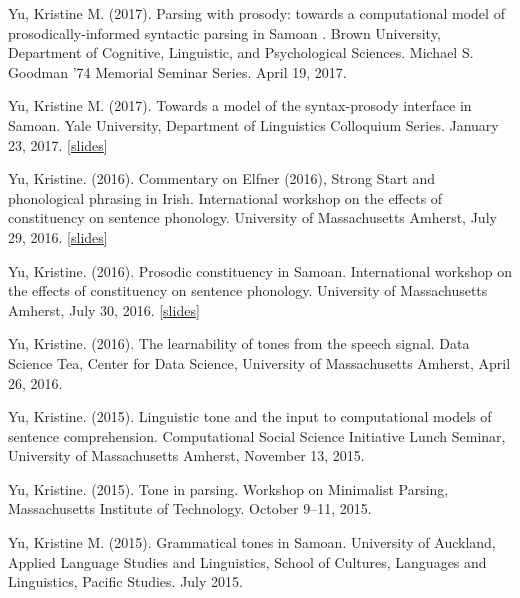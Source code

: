 \documentclass[10pt]{article}
\begin{document}
\begin{bibenum}

\item Yu, Kristine M. (2017). Parsing with prosody: towards a computational model of prosodically-informed syntactic parsing in Samoan
. Brown University, Department of
  Cognitive, Linguistic, and Psychological Sciences. Michael S. Goodman '74 Memorial Seminar Series. April 19, 2017.  
\item Yu, Kristine M. (2017). Towards a model of the syntax-prosody interface in Samoan. Yale University, Department of
  Linguistics Colloquium Series. January 23, 2017. [\href{https://speakerdeck.com/krisyu/towards-a-model-of-the-samoan-syntax-prosody-interface}{slides}]
  \item Yu, Kristine. (2016). Commentary on Elfner (2016), Strong
    Start and phonological phrasing in Irish. International workshop on the effects of
    constituency on sentence phonology. University of Massachusetts
    Amherst, July 29, 2016. [\href{https://speakerdeck.com/krisyu/commentary-on-elfners-strong-start-and-phonological-phrasing-in-irish}{slides}]

  \item Yu, Kristine. (2016). Prosodic constituency in Samoan. International workshop on the effects of
    constituency on sentence phonology. University of Massachusetts
    Amherst, July 30, 2016. [\href{https://speakerdeck.com/krisyu/prosodic-constituency-in-samoan}{slides}]

  \item Yu, Kristine. (2016). The learnability of tones from the
    speech signal. Data Science Tea, Center for Data
    Science, University of Massachusetts Amherst, April 26, 2016.

  \item Yu, Kristine. (2015). Linguistic tone and the input to
    computational models of sentence comprehension. Computational
    Social Science Initiative Lunch Seminar, University of
    Massachusetts Amherst, November 13, 2015.

  \item Yu, Kristine. (2015). Tone in parsing. Workshop on Minimalist
    Parsing, Massachusetts Institute of Technology. October 9--11, 2015.

    \item Yu, Kristine M. (2015). Grammatical tones in
      Samoan. University of Auckland, Applied Language Studies and Linguistics, School of Cultures, Languages and Linguistics, Pacific Studies. July 2015.


\end{bibenum}
\end{document}

